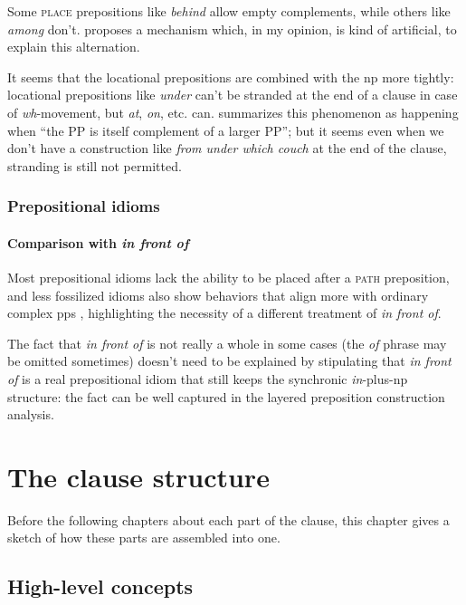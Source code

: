 \documentclass[UTF8, a4paper, oneside, scheme=plain, 12pt]{ctexbook}
\newcommand*{\citepage}[1]{p.~{#1}}
\newcommand{\form}[1]{\emph{#1}}
\newcommand{\category}[1]{\textsc{#1}}
\begin{document}
Some \category{place} prepositions like \form{behind} allow empty complements,
while others like \form{among} don't.
\cite{spatialpp} proposes a mechanism which, in my opinion, is kind of artificial,
to explain this alternation.


It seems that the locational prepositions are combined with the \acs{np} more tightly:
locational prepositions like \form{under} can't be stranded at the end of a clause 
in case of \form{wh}-movement, 
but \form{at}, \form{on}, etc. can.
\citet[\citepage{630}]{cgel} summarizes this phenomenon as happening when
``the PP is itself complement of a larger PP''; 
but it seems even when we don't have a construction like \form{from under which couch}
at the end of the clause, 
stranding is still not permitted.

\subsection{Prepositional idioms}

\subsubsection{Comparison with \form{in front of}}\label{sec:np.pp.idiom.in-front-of}

Most prepositional idioms lack the ability 
to be placed after a \category{path} preposition,
and less fossilized idioms also show behaviors that align more with ordinary complex \acs{pp}s 
\citep[\citepage{620}]{cgel},
highlighting the necessity of a different treatment of \form{in front of}.

The fact that \form{in front of} is not really a whole in some cases 
(the \form{of} phrase may be omitted sometimes) 
doesn't need to be explained by stipulating that 
\form{in front of} is a real prepositional idiom that 
still keeps the synchronic \form{in}-plus-\acs{np} structure:
the fact can be well captured in the layered preposition construction analysis.

\chapter{The clause structure}\label{chap:simple-clause}

Before the following chapters about each part of the clause,
this chapter gives a sketch of how these parts are assembled into one.

\section{High-level concepts}
\end{document}
